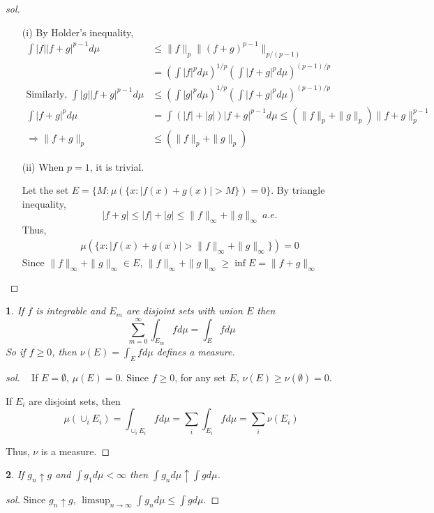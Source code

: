 \documentclass{report}
\newtheorem{ex}{}[section]
\begin{document}
\begin{proof}[sol]~
\begin{enumerate}
    \item[(i)] By Holder's inequality,
    \begin{align*}
    \int |f||f+g|^{p-1}d\mu &\le \|f\|_p\|(f+g)^{p-1}\|_{p/(p-1)}\\
    &= (\int |f|^pd\mu)^{1/p}(\int |f+g|^pd\mu)^{(p-1)/p}\\
    \text{Similarly, }\int |g||f+g|^{p-1}d\mu &\le (\int |g|^pd\mu)^{1/p}(\int |f+g|^pd\mu)^{(p-1)/p}\\
    \int |f+g|^pd\mu &= \int (|f|+|g|)|f+g|^{p-1}d\mu \le (\|f\|_p+\|g\|_p)\|f+g\|_p^{p-1}\\
    \Rightarrow \|f+g\|_p &\le(\|f\|_p+\|g\|_p)
    \end{align*}
    \item[(ii)] When $p = 1$, it is trivial.
    
    Let the set $E = \{M: \mu(\{x : |f(x)+g(x)| > M\}) = 0\}$. By triangle inequality,
    \[|f+g| \le |f| + |g| \le \|f\|_\infty +\|g\|_\infty \ a.e.\]
    Thus,
    \begin{align*}
        \mu(\{x : |f(x)+g(x)| > \|f\|_\infty + \|g\|_\infty\}) = 0
    \end{align*}
    Since $\|f\|_\infty +\|g\|_\infty\in E$, $\|f\|_\infty +\|g\|_\infty \ge \inf E =\|f+g\|_\infty$
\end{enumerate}
\end{proof}
\begin{ex}
If $f$ is integrable and $E_m$ are disjoint sets with union $E$ then
\[\sum_{m=0}^\infty \int_{E_m} f d\mu = \int_E fd\mu\]
So if $f \ge 0$, then $\nu(E) = \int_E fd\mu$ defines a measure.
\end{ex}
\begin{proof}[sol]~
If $E = \emptyset$, $\mu(E) = 0$. Since $f \ge 0$, for any set $E$, $\nu(E) \ge \nu(\emptyset) = 0$.

If $E_i$ are disjoint sets, then
\[\mu(\cup_i E_i) = \int_{\cup_i E_i} fd\mu = \sum_i\int_{E_i}fd\mu = \sum_i \nu(E_i)\]

Thus, $\nu$ is a measure.
\end{proof}
\begin{ex}
If $g_n \uparrow g$ and $\int g_1 d\mu < \infty$ then $\int g_n d\mu \uparrow \int gd\mu$.
\end{ex}
\begin{proof}[sol]
Since $g_n \uparrow g$, $\limsup_{n\to\infty}\int g_nd\mu \le \int gd\mu$.


\end{proof}
\end{document}
